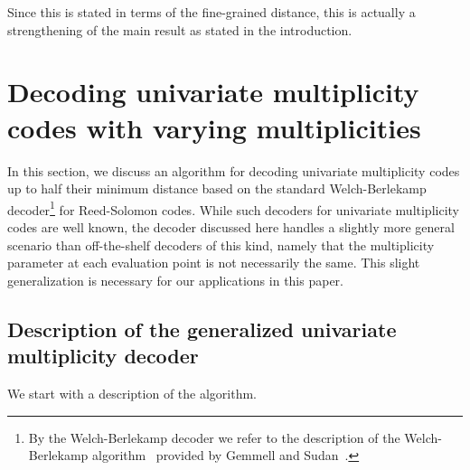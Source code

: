 \documentclass{article}
\begin{document}
	
	Since this is stated in terms of the fine-grained distance, this is actually a strengthening of the main result as stated in the introduction.
	
	\section{Decoding univariate multiplicity codes with varying
		multiplicities}\label{sec:BWmultiplicity}
	In this section, we discuss an algorithm for decoding univariate
	multiplicity codes up to half their minimum distance based on the
	standard Welch-Berlekamp decoder\footnote{By the
		Welch-Berlekamp decoder we refer to the description of the Welch-Berlekamp algorithm~\cite{WelchB1986} provided by
		Gemmell and Sudan~\cite{GemmellS1992}.} for Reed-Solomon codes. While such
	decoders for univariate multiplicity codes are well known, the decoder
	discussed here handles a slightly more general scenario than
	off-the-shelf decoders of this kind, namely that the multiplicity
	parameter at each evaluation point is not necessarily the same. This
	slight generalization is necessary for our applications in this
	paper. %
	
	\subsection{Description of the generalized univariate multiplicity decoder}
	
	We start with a description of the algorithm.
\end{document}

